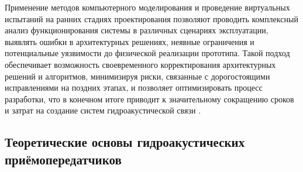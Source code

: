 \documentclass[
    numbers=section,
    document-code={ВКРБ--09.03.04--10.19--XX--26--81}
]{../latex/fqw}
\begin{document}
    Применение методов компьютерного моделирования и проведение виртуальных испытаний на ранних стадиях проектирования
    позволяют проводить
    комплексный анализ функционирования системы в различных сценариях эксплуатации,
    выявлять ошибки в архитектурных решениях,
    неявные ограничения и
    потенциальные уязвимости до физической реализации прототипа.
    Такой подход обеспечивает возможность своевременного корректирования архитектурных решений и алгоритмов,
    минимизируя риски, связанные с дорогостоящими исправлениями на поздних этапах,
    и позволяет оптимизировать процесс разработки,
    что в конечном итоге приводит к значительному сокращению сроков и затрат на создание систем гидроакустической связи
    \nbspace\cite{clineBenefitsSimulationDrivenDesign2017}.

    \subsection{Теоретические основы гидроакустических приёмопередатчиков}
    \label{subsec:theoretical_foundations_of_hydroacoustic_transceivers}
    \vspace{\baselineskip}
\end{document}
